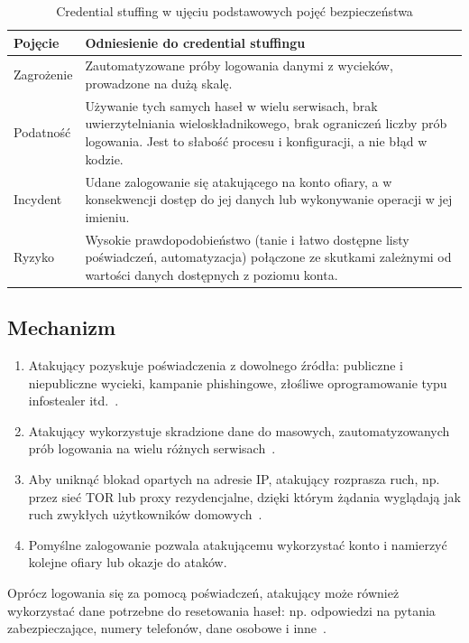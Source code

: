 \documentclass[12pt,a4paper]{article}
\begin{document}
\begin{table}[h]
\centering
\small
\begin{tabularx}{\linewidth}{@{}l>{\raggedright\arraybackslash}X@{}}
\toprule
\textbf{Pojęcie} & \textbf{Odniesienie do credential stuffingu} \\
\midrule
Zagrożenie & Zautomatyzowane próby logowania danymi z wycieków, prowadzone na dużą skalę. \\
Podatność & Używanie tych samych haseł w wielu serwisach, brak uwierzytelniania wieloskładnikowego, brak ograniczeń liczby prób logowania. Jest to słabość procesu i konfiguracji, a nie błąd w kodzie. \\
Incydent & Udane zalogowanie się atakującego na konto ofiary, a w konsekwencji dostęp do jej danych lub wykonywanie operacji w jej imieniu. \\
Ryzyko & Wysokie prawdopodobieństwo (tanie i łatwo dostępne listy poświadczeń, automatyzacja) połączone ze skutkami zależnymi od wartości danych dostępnych z poziomu konta. \\
\bottomrule
\end{tabularx}
\caption{Credential stuffing w ujęciu podstawowych pojęć bezpieczeństwa}
\end{table}

\subsection{Mechanizm}

\begin{enumerate}
    \item Atakujący pozyskuje poświadczenia z dowolnego źródła: publiczne i niepubliczne wycieki, kampanie phishingowe, złośliwe oprogramowanie typu infostealer itd.~\cite{owasp_cs,hns_okta2024}.
    \item Atakujący wykorzystuje skradzione dane do masowych, zautomatyzowanych prób logowania na wielu różnych serwisach~\cite{owasp_cs}.
    \item Aby uniknąć blokad opartych na adresie IP, atakujący rozprasza ruch, np. przez sieć TOR lub proxy rezydencjalne, dzięki którym żądania wyglądają jak ruch zwykłych użytkowników domowych~\cite{hns_okta2024}.
    \item Pomyślne zalogowanie pozwala atakującemu wykorzystać konto i namierzyć kolejne ofiary lub okazje do ataków.
\end{enumerate}

Oprócz logowania się za pomocą poświadczeń, atakujący może również wykorzystać dane potrzebne do resetowania haseł: np. odpowiedzi na pytania zabezpieczające, numery telefonów, dane osobowe i inne~\cite{owasp_cs}.
\end{document}
